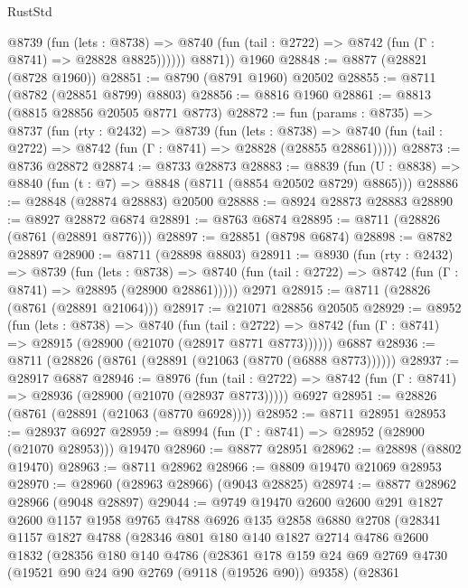 \begin{lexlean}{RustStd}
\begin{coremodule}
            @8739
              (fun (lets : @8738) =>
              @8740 (fun (tail : @2722) => @8742 (fun (Γ : @8741) => @28828 @8825))))))
        @8871))
    @1960
@28848 := @8877 (@28821 (@8728 @1960))
@28851 := @8790 (@8791 @1960) @20502
@28855 := @8711 (@8782 (@28851 @8799) @8803)
@28856 := @8816 @1960
@28861 := @8813 (@8815 @28856 @20505 @8771 @8773)
@28872 := fun (params : @8735) =>
  @8737
    (fun (rty : @2432) =>
    @8739
      (fun (lets : @8738) =>
      @8740 (fun (tail : @2722) => @8742 (fun (Γ : @8741) => @28828 (@28855 @28861)))))
@28873 := @8736 @28872
@28874 := @8733 @28873
@28883 := @8839
    (fun (U : @8838) => @8840 (fun (t : @7) => @8848 (@8711 (@8854 @20502 @8729) @8865)))
@28886 := @28848 (@28874 @28883) @20500
@28888 := @8924 @28873 @28883
@28890 := @8927 @28872 @6874
@28891 := @8763 @6874
@28895 := @8711 (@28826 (@8761 (@28891 @8776)))
@28897 := @28851 (@8798 @6874)
@28898 := @8782 @28897
@28900 := @8711 (@28898 @8803)
@28911 := @8930
    (fun (rty : @2432) =>
    @8739
      (fun (lets : @8738) =>
      @8740 (fun (tail : @2722) => @8742 (fun (Γ : @8741) => @28895 (@28900 @28861)))))
    @2971
@28915 := @8711 (@28826 (@8761 (@28891 @21064)))
@28917 := @21071 @28856 @20505
@28929 := @8952
    (fun (lets : @8738) =>
    @8740
      (fun (tail : @2722) =>
      @8742 (fun (Γ : @8741) => @28915 (@28900 (@21070 (@28917 @8771 @8773))))))
    @6887
@28936 := @8711 (@28826 (@8761 (@28891 (@21063 (@8770 (@6888 @8773))))))
@28937 := @28917 @6887
@28946 := @8976
    (fun (tail : @2722) => @8742 (fun (Γ : @8741) => @28936 (@28900 (@21070 (@28937 @8773)))))
    @6927
@28951 := @28826 (@8761 (@28891 (@21063 (@8770 @6928))))
@28952 := @8711 @28951
@28953 := @28937 @6927
@28959 := @8994 (fun (Γ : @8741) => @28952 (@28900 (@21070 @28953))) @19470
@28960 := @8877 @28951
@28962 := @28898 (@8802 @19470)
@28963 := @8711 @28962
@28966 := @8809 @19470 @21069 @28953
@28970 := @28960 (@28963 @28966) (@9043 @28825)
@28974 := @8877 @28962 @28966 (@9048 @28897)
@29044 := @9749
    @19470
    @2600
    @2600
    @291
    @1827
    @2600
    @1157
    @1958
    @9765
    @4788
    @6926
    @135
    @2858
    @6880
    @2708
    (@28341
      @1157
      @1827
      @4788
      (@28346
        @801
        @180
        @140
        @1827
        @2714
        @4786
        @2600
        @1832
        (@28356
          @180
          @140
          @4786
          (@28361
            @178
            @159
            @24
            @69
            @2769
            @4730
            (@19521 @90 @24 @90 @2769 (@9118 (@19526 @90)) @9358)
            (@28361

\end{coremodule}
\end{lexlean}
